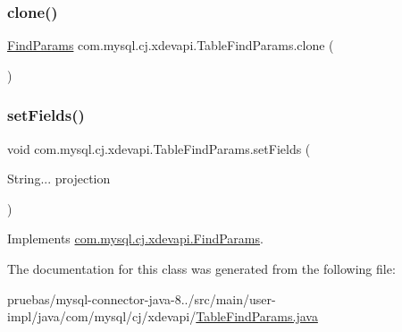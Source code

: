 \subsubsection{\texorpdfstring{clone()}{clone()}}
{\footnotesize\ttfamily \mbox{\hyperlink{interfacecom_1_1mysql_1_1cj_1_1xdevapi_1_1_find_params}{Find\+Params}} com.\+mysql.\+cj.\+xdevapi.\+Table\+Find\+Params.\+clone (\begin{DoxyParamCaption}{ }\end{DoxyParamCaption})}

\mbox{\label{classcom_1_1mysql_1_1cj_1_1xdevapi_1_1_table_find_params_a94e20b606a6c17ac6990fab5c212555b}} 
\subsubsection{\texorpdfstring{set\+Fields()}{setFields()}}
{\footnotesize\ttfamily void com.\+mysql.\+cj.\+xdevapi.\+Table\+Find\+Params.\+set\+Fields (\begin{DoxyParamCaption}\item[{String...}]{projection }\end{DoxyParamCaption})}



Implements \mbox{\hyperlink{interfacecom_1_1mysql_1_1cj_1_1xdevapi_1_1_find_params_a8326dbc363863872a177b89345f6f419}{com.\+mysql.\+cj.\+xdevapi.\+Find\+Params}}.



The documentation for this class was generated from the following file\+:\begin{DoxyCompactItemize}
\item 
pruebas/mysql-\/connector-\/java-\/8../src/main/user-\/impl/java/com/mysql/cj/xdevapi/\mbox{\hyperlink{_table_find_params_8java}{Table\+Find\+Params.\+java}}\end{DoxyCompactItemize}
